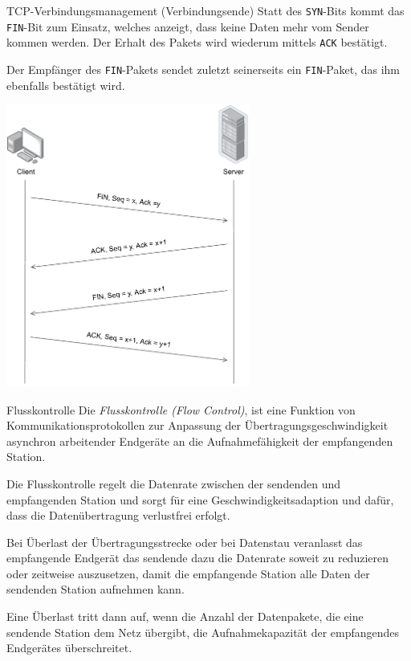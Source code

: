 \begin{defi}{TCP-Verbindungsmanagement (Verbindungsende)}
    Statt des \texttt{SYN}-Bits kommt das \texttt{FIN}-Bit  zum Einsatz, welches anzeigt, dass keine Daten mehr vom Sender kommen werden.
    Der Erhalt des Pakets wird wiederum mittels \texttt{ACK} bestätigt.

    Der Empfänger des \texttt{FIN}-Pakets sendet zuletzt seinerseits ein \texttt{FIN}-Paket, das ihm ebenfalls bestätigt wird.

    \centering
    \includegraphics[width=0.6\textwidth]{includes/figures/defi_tcp_verbindungsabbau.pdf}
\end{defi}

\begin{defi}{Flusskontrolle}
    Die \emph{Flusskontrolle (Flow Control)}, ist eine Funktion von Kommunikationsprotokollen zur Anpassung der Übertragungsgeschwindigkeit asynchron arbeitender Endgeräte an die Aufnahmefähigkeit der empfangenden Station.

    Die Flusskontrolle regelt die Datenrate zwischen der sendenden und empfangenden Station und sorgt für eine Geschwindigkeitsadaption und dafür, dass die Datenübertragung verlustfrei erfolgt.

    Bei Überlast der Übertragungsstrecke oder bei Datenstau veranlasst das empfangende Endgerät das sendende dazu die Datenrate soweit zu reduzieren oder zeitweise auszusetzen, damit die empfangende Station alle Daten der sendenden Station aufnehmen kann.

    Eine Überlast tritt dann auf, wenn die Anzahl der Datenpakete, die eine sendende Station dem Netz übergibt, die Aufnahmekapazität der empfangendes Endgerätes überschreitet.
\end{defi}

